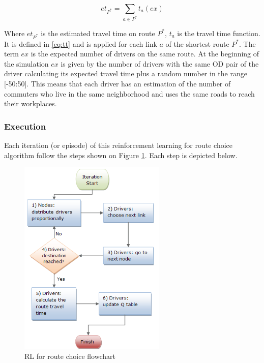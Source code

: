 \documentclass[12pt]{article}
\begin{document}
\begin{equation}
\label{eq:ett}
et_{P^*} = \sum_{a \in P^*} t_a(ex)
\end{equation}

Where $et_{P^*}$ is the estimated travel time on route $P^*$, $t_a$ is the travel time function. It is defined in \eqref{eq:tt} and is applied for each link $a$ of the shortest route $P^*$. The term $ex$ is the expected number of drivers on the same route. At the beginning of the simulation $ex$ is given by the number of drivers with the same OD pair of the driver calculating its expected travel time plus a random number in the range [-50:50]. This means that each driver has an estimation of the number of commuters who live in the same neighborhood and uses the same roads to reach their workplaces.

\subsubsection{Execution}

Each iteration (or episode) of this reinforcement learning for route choice algorithm follow the steps shown on Figure \ref{fig:flowchart}. Each step is depicted below.

\begin{figure}[ht]
    \centerline{\includegraphics[width=7cm]{img/flowchart.png}}
    \caption{RL for route choice flowchart}
    \label{fig:flowchart}
\end{figure}
\end{document}
